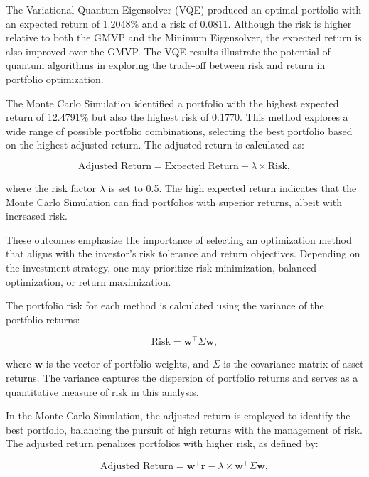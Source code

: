 \documentclass[%
 reprint,
 amsmath,amssymb,
 aps,
]{revtex4-2}
\begin{document}
The Variational Quantum Eigensolver (VQE) produced an optimal portfolio with an expected return of 1.2048\% and a risk of 0.0811. Although the risk is higher relative to both the GMVP and the Minimum Eigensolver, the expected return is also improved over the GMVP. The VQE results illustrate the potential of quantum algorithms in exploring the trade-off between risk and return in portfolio optimization.

The Monte Carlo Simulation identified a portfolio with the highest expected return of 12.4791\% but also the highest risk of 0.1770. This method explores a wide range of possible portfolio combinations, selecting the best portfolio based on the highest adjusted return. The adjusted return is calculated as:

\begin{equation}
\text{Adjusted Return} = \text{Expected Return} - \lambda \times \text{Risk},
\end{equation}

where the risk factor $\lambda$ is set to 0.5. The high expected return indicates that the Monte Carlo Simulation can find portfolios with superior returns, albeit with increased risk.

These outcomes emphasize the importance of selecting an optimization method that aligns with the investor's risk tolerance and return objectives. Depending on the investment strategy, one may prioritize risk minimization, balanced optimization, or return maximization.

The portfolio risk for each method is calculated using the variance of the portfolio returns:

\begin{equation}
\text{Risk} = \mathbf{w}^\top \Sigma \mathbf{w},
\end{equation}

where $\mathbf{w}$ is the vector of portfolio weights, and $\Sigma$ is the covariance matrix of asset returns. The variance captures the dispersion of portfolio returns and serves as a quantitative measure of risk in this analysis.

In the Monte Carlo Simulation, the adjusted return is employed to identify the best portfolio, balancing the pursuit of high returns with the management of risk. The adjusted return penalizes portfolios with higher risk, as defined by:

\begin{equation}
\text{Adjusted Return} = \mathbf{w}^\top \mathbf{r} - \lambda \times \mathbf{w}^\top \Sigma \mathbf{w},
\end{equation}
\end{document}
